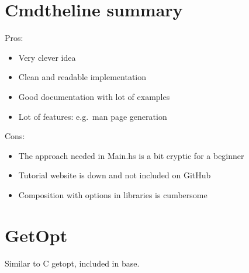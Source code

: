 \documentclass[]{article}
\begin{document}
\section{Cmdtheline summary}

Pros:

\begin{itemize}
\item
  Very clever idea
\item
  Clean and readable implementation
\item
  Good documentation with lot of examples
\item
  Lot of features: e.g.~man page generation
\end{itemize}

Cons:

\begin{itemize}
\item
  The approach needed in Main.hs is a bit cryptic for a beginner
\item
  Tutorial website is down and not included on GitHub
\item
  Composition with options in libraries is cumbersome
\end{itemize}

\section{GetOpt}

Similar to C getopt, included in base.
\end{document}
